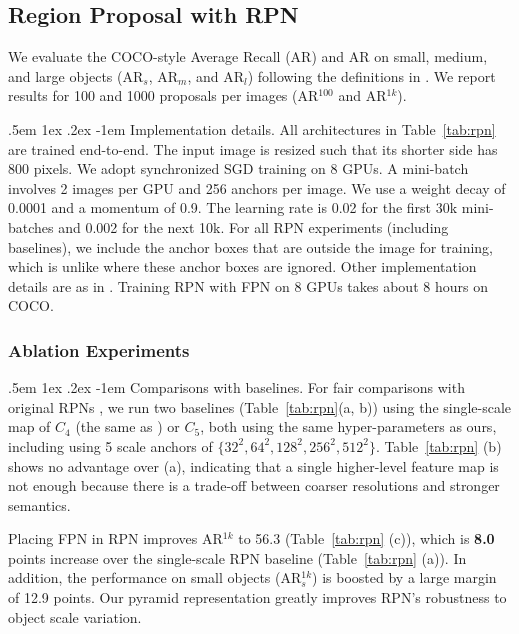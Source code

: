 \documentclass[10pt,twocolumn,letterpaper]{article}
\makeatletter
\renewcommand\paragraph{\@startsection{paragraph}{4}{\z@}%
  {.5em \@plus1ex \@minus.2ex}%
  {-1em}%
  {\normalfont\normalsize\bfseries}}
\makeatother
\begin{document}
\subsection{Region Proposal with RPN}
\label{sec:exp_rpn}

We evaluate the COCO-style Average Recall (AR) and AR on small, medium, and large objects (AR$_s$, AR$_m$, and AR$_l$) following the definitions in \cite{Lin2014}.
We report results for 100 and 1000 proposals per images (AR$^{100}$ and AR$^{1k}$).

\paragraph{Implementation details.}
All architectures in Table~\ref{tab:rpn} are trained end-to-end.
The input image is resized such that its shorter side has 800 pixels.
We adopt synchronized SGD training on 8 GPUs.
A mini-batch involves 2 images per GPU and 256 anchors per image.
We use a weight decay of 0.0001 and a momentum of 0.9.
The learning rate is 0.02 for the first 30k mini-batches and 0.002 for the next 10k.
For all RPN experiments (including baselines), we include the anchor boxes that are outside the image for training, which is unlike \cite{Ren2015a} where these anchor boxes are ignored.
Other implementation details are as in \cite{Ren2015a}.
Training RPN with FPN on 8 GPUs takes about 8 hours on COCO.

\subsubsection{Ablation Experiments}

\paragraph{Comparisons with baselines.} For fair comparisons with original RPNs \cite{Ren2015a}, we run two baselines (Table~\ref{tab:rpn}(a, b)) using the single-scale map of $C_4$ (the same as \cite{He2016}) or $C_5$, both using the same hyper-parameters as ours, including using 5 scale anchors of $\{32^2, 64^2, 128^2, 256^2, 512^2\}$.
Table~\ref{tab:rpn} (b) shows no advantage over (a), indicating that a single higher-level feature map is not enough because there is a trade-off between coarser resolutions and stronger semantics.

Placing FPN in RPN improves AR$^{1k}$ to 56.3 (Table~\ref{tab:rpn} (c)), which is \textbf{8.0} points increase over the single-scale RPN baseline (Table~\ref{tab:rpn} (a)).
In addition, the performance on small objects (AR$^{1k}_s$) is boosted by a large margin of 12.9 points.
Our pyramid representation greatly improves RPN's robustness to object scale variation.
\end{document}

